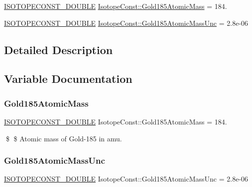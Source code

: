 \begin{DoxyCompactItemize}
\item 
\mbox{\hyperlink{group___isotope_const-_macros_ga8f45a7272ce02c0b4c65c44636ed719a}{I\+S\+O\+T\+O\+P\+E\+C\+O\+N\+S\+T\+\_\+\+D\+O\+U\+B\+LE}} \mbox{\hyperlink{group___isotope_const-_gold-_au185_ga26b805e271bd9881ed5796ab5f18e14e}{Isotope\+Const\+::\+Gold185\+Atomic\+Mass}} = 184.
\item 
\mbox{\hyperlink{group___isotope_const-_macros_ga8f45a7272ce02c0b4c65c44636ed719a}{I\+S\+O\+T\+O\+P\+E\+C\+O\+N\+S\+T\+\_\+\+D\+O\+U\+B\+LE}} \mbox{\hyperlink{group___isotope_const-_gold-_au185_gaa038b66d2ce5befa47c21ada680d9fd7}{Isotope\+Const\+::\+Gold185\+Atomic\+Mass\+Unc}} = 2.\+8e-\/06
\end{DoxyCompactItemize}


\subsection{Detailed Description}


\subsection{Variable Documentation}
\mbox{\label{group___isotope_const-_gold-_au185_ga26b805e271bd9881ed5796ab5f18e14e}} 
\subsubsection{\texorpdfstring{Gold185\+Atomic\+Mass}{Gold185AtomicMass}}
{\footnotesize\ttfamily \mbox{\hyperlink{group___isotope_const-_macros_ga8f45a7272ce02c0b4c65c44636ed719a}{I\+S\+O\+T\+O\+P\+E\+C\+O\+N\+S\+T\+\_\+\+D\+O\+U\+B\+LE}} Isotope\+Const\+::\+Gold185\+Atomic\+Mass = 184.}

\$ \$ Atomic mass of Gold-\/185 in amu. \mbox{\label{group___isotope_const-_gold-_au185_gaa038b66d2ce5befa47c21ada680d9fd7}} 
\subsubsection{\texorpdfstring{Gold185\+Atomic\+Mass\+Unc}{Gold185AtomicMassUnc}}
{\footnotesize\ttfamily \mbox{\hyperlink{group___isotope_const-_macros_ga8f45a7272ce02c0b4c65c44636ed719a}{I\+S\+O\+T\+O\+P\+E\+C\+O\+N\+S\+T\+\_\+\+D\+O\+U\+B\+LE}} Isotope\+Const\+::\+Gold185\+Atomic\+Mass\+Unc = 2.\+8e-\/06}

